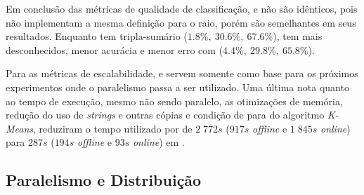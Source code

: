 


Em conclusão das métricas de qualidade de classificação,  e \serial
não são idênticos, pois não implementam a mesma definição para o raio, porém são semelhantes
em seus resultados.
Enquanto  tem tripla-sumário 
($1.8\%,\: 30.6\%,\: 67.6\%$), \serial tem
mais desconhecidos, menor acurácia e menor erro com 
($4.4\%,\: 29.8\%,\: 65.8\%$).

Para as métricas de escalabilidade,  e \serial servem somente como base
para os próximos experimentos onde o paralelismo passa a ser utilizado.
Uma última nota quanto ao tempo de execução, mesmo não sendo paralelo, as
otimizações de memória, redução do uso de \emph{strings} e outras cópias e
condição de para do algoritmo \emph{K-Means}, reduziram o tempo utilizado por
 de $2\;772s$ ($917s$ \emph{offline} e $1\;845s$ \emph{online}) para
$287s$ ($194s$ \emph{offline} e $93s$ \emph{online}) em \serial.

\subsection{Paralelismo e Distribuição}


